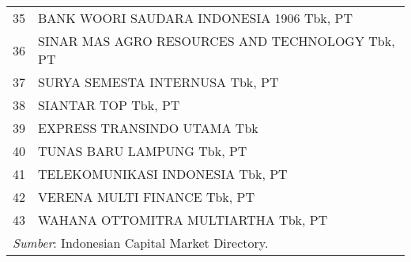 \begin{longtable}{r l}
35 &  BANK WOORI SAUDARA INDONESIA 1906 Tbk, PT  \\
36 &  SINAR MAS AGRO RESOURCES AND TECHNOLOGY Tbk, PT  \\
37 &  SURYA SEMESTA INTERNUSA Tbk, PT  \\
38 &  SIANTAR TOP Tbk, PT  \\
39 &  EXPRESS TRANSINDO UTAMA Tbk  \\
40 &  TUNAS BARU LAMPUNG Tbk, PT  \\
41 &  TELEKOMUNIKASI INDONESIA Tbk, PT  \\
42 &  VERENA MULTI FINANCE Tbk, PT  \\
43 &  WAHANA OTTOMITRA MULTIARTHA Tbk, PT  \\


    \bottomrule
    \multicolumn{2}{l}{\emph{Sumber}: Indonesian Capital Market Directory.}
    \end{longtable}%


\cleardoublepage
\newpage




